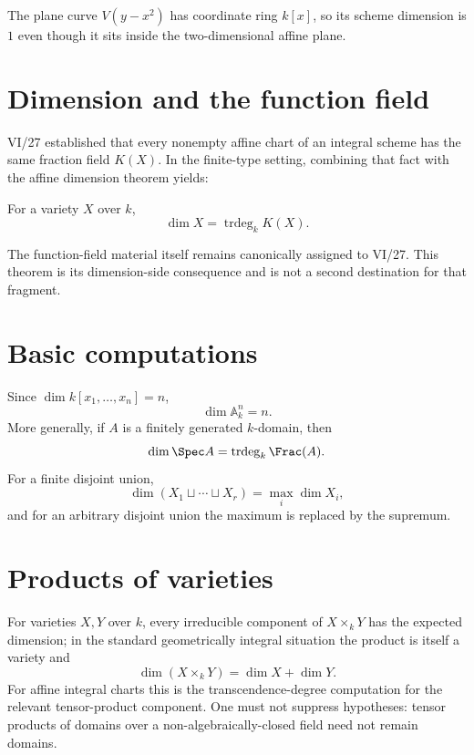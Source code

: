 \begin{example}\label{ex:vi30-expand-02}
The plane curve $V(y-x^2)$ has coordinate ring $k[x]$, so its scheme dimension is $1$ even though it sits inside the two-dimensional affine plane.
\end{example}
\section{Dimension and the function field}\label{sec:vi30-trdeg}
VI/27 established that every nonempty affine chart of an integral scheme has the same fraction field $K(X)$.  In the
finite-type setting, combining that fact with the affine dimension theorem yields:
\begin{theorem}\label{thm:vi30-trdeg}
For a variety $X$ over $k$,
\[
\dim X=\operatorname{trdeg}_k K(X).
\]
\end{theorem}
The function-field material itself remains canonically assigned to VI/27.  This theorem is its dimension-side
consequence and is not a second destination for that fragment.


\section{Basic computations}\label{sec:vi30-computations}
Since $\dim k[x_1,\ldots,x_n]=n$,
\[
\dim\mathbb A^n_k=n.
\]
More generally, if $A$ is a finitely generated $k$-domain, then
\[
\dim\Spec A=\operatorname{trdeg}_k\Frac(A).
\]
For a finite disjoint union,
\[
\dim(X_1\sqcup\cdots\sqcup X_r)=\max_i\dim X_i,
\]
and for an arbitrary disjoint union the maximum is replaced by the supremum.


\section{Products of varieties}\label{sec:vi30-products}
For varieties $X,Y$ over $k$, every irreducible component of $X\times_kY$ has the expected dimension; in the standard
geometrically integral situation the product is itself a variety and
\[
\dim(X\times_kY)=\dim X+\dim Y.
\]
For affine integral charts this is the transcendence-degree computation for the relevant tensor-product component.
One must not suppress hypotheses: tensor products of domains over a non-algebraically-closed field need not remain
domains.


